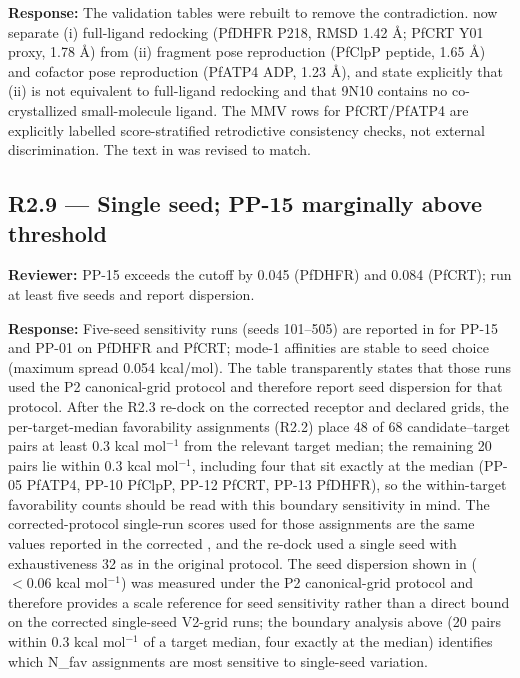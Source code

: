 \documentclass[11pt]{article}
\begin{document}
\textbf{Response:} The validation tables were rebuilt to remove the contradiction.
 now separate (i) full-ligand redocking (PfDHFR P218, RMSD 1.42 \AA; PfCRT Y01 proxy,
1.78 \AA) from (ii) fragment pose reproduction (PfClpP peptide, 1.65 \AA) and cofactor pose
reproduction (PfATP4 ADP, 1.23 \AA), and state explicitly that (ii) is not equivalent to
full-ligand redocking and that 9N10 contains no co-crystallized small-molecule ligand. The MMV
rows for PfCRT/PfATP4 are explicitly labelled score-stratified retrodictive consistency checks,
not external discrimination. The text in  was revised to match.

\subsection*{R2.9 --- Single seed; PP-15 marginally above threshold}
\textbf{Reviewer:} PP-15 exceeds the cutoff by 0.045 (PfDHFR) and 0.084 (PfCRT); run at least
five seeds and report dispersion.

\textbf{Response:} Five-seed sensitivity runs (seeds 101--505) are reported in 
for PP-15 and PP-01 on PfDHFR and PfCRT; mode-1 affinities are stable to seed choice
(maximum spread 0.054 kcal/mol). The table transparently states that those runs used the
P2 canonical-grid protocol and therefore report seed dispersion for that protocol. After the
R2.3 re-dock on the corrected receptor and declared grids, the per-target-median
favorability assignments (R2.2) place 48 of 68 candidate--target pairs at least
0.3 kcal mol$^{-1}$ from the relevant target median; the remaining 20 pairs lie within
0.3 kcal mol$^{-1}$, including four that sit exactly at the median (PP-05 PfATP4, PP-10
PfClpP, PP-12 PfCRT, PP-13 PfDHFR), so the within-target favorability counts should be read
with this boundary sensitivity in mind. The corrected-protocol single-run scores used for those assignments
are the same values reported in the corrected , and the re-dock used a single seed
with exhaustiveness 32 as in the original protocol. The seed dispersion shown in 
($<0.06$ kcal mol$^{-1}$) was measured under the P2 canonical-grid protocol and therefore
provides a scale reference for seed sensitivity rather than a direct bound on the corrected
single-seed V2-grid runs; the boundary analysis above (20 pairs within 0.3 kcal mol$^{-1}$ of a
target median, four exactly at the median) identifies which N\_fav assignments are most
sensitive to single-seed variation.
\end{document}
